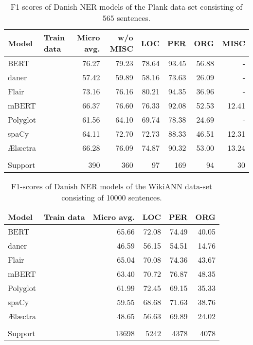 \documentclass[main.tex]{subfiles}
\begin{document}
\begin{table}[H]
	\begin{center}
		\begin{tabular}{l l r r r r r r}
			Model & Train data & Micro avg. & w/o MISC & LOC & PER & ORG & MISC \\
			\hline
			BERT &  & 76.27 & 79.23 & 78.64 & 93.45 & 56.88 & - \\
			daner &  & 57.42 & 59.89 & 58.16 & 73.63 & 26.09 & - \\
			Flair &  & 73.16 & 76.16 & 80.21 & 94.35 & 36.96 & - \\
			mBERT &  & 66.37 & 76.60 & 76.33 & 92.08 & 52.53 & 12.41 \\
			Polyglot &  & 61.56 & 64.10 & 69.74 & 78.38 & 24.69 & - \\
			spaCy &  & 64.11 & 72.70 & 72.73 & 88.33 & 46.51 & 12.31 \\
			Ælæctra &  & 66.28 & 76.09 & 74.87 & 90.32 & 53.00 & 13.24 \\
			 &  &  &  &  &  &  &  \\
			Support &  & 390 & 360 & 97 & 169 & 94 & 30 \\
		\end{tabular}
	\end{center}
	\caption{F1\pro-scores of Danish NER models of the Plank data-set consisting of 565 sentences.}
	\label{tab:Plank}
\end{table}

\begin{table}[H]
	\begin{center}
		\begin{tabular}{l l r r r r}
			Model & Train data & Micro avg. & LOC & PER & ORG \\
			\hline
			BERT &  & 65.66 & 72.08 & 74.49 & 40.05 \\
			daner &  & 46.59 & 56.15 & 54.51 & 14.76 \\
			Flair &  & 65.04 & 70.08 & 74.36 & 43.67 \\
			mBERT &  & 63.40 & 70.72 & 76.87 & 48.35 \\
			Polyglot &  & 61.99 & 72.45 & 69.15 & 35.33 \\
			spaCy &  & 59.55 & 68.68 & 71.63 & 38.76 \\
			Ælæctra &  & 48.65 & 56.63 & 69.89 & 24.02 \\
			 &  &  &  &  &  \\
			Support &  & 13698 & 5242 & 4378 & 4078 \\
		\end{tabular}
	\end{center}
	\caption{F1\pro-scores of Danish NER models of the WikiANN data-set consisting of 10000 sentences.}
	\label{tab:WikiANN}
\end{table}
\end{document}
